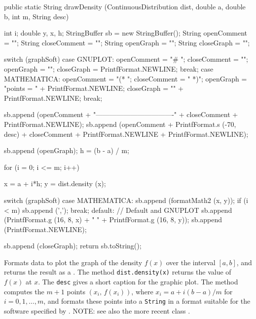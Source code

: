 \begin{code}

   public static String drawDensity (ContinuousDistribution dist, double a,
                                     double b, int m, String desc)\begin{hide} {
      int i;
      double y, x, h;
      StringBuffer sb = new StringBuffer();
      String openComment = "";
      String closeComment = "";
      String openGraph = "";
      String closeGraph = "";

      switch (graphSoft) {
      case GNUPLOT:
        openComment = "# ";
        closeComment = "";
        openGraph = "";
        closeGraph = PrintfFormat.NEWLINE;
        break;
      case MATHEMATICA:
        openComment = "(* ";
        closeComment = " *)";
        openGraph = "points = { " + PrintfFormat.NEWLINE;
        closeGraph = "}" + PrintfFormat.NEWLINE;
        break;
      }

      sb.append (openComment + "----------------------------------" +
                   closeComment  + PrintfFormat.NEWLINE);
      sb.append (openComment + PrintfFormat.s (-70, desc)
                    + closeComment  + PrintfFormat.NEWLINE +
                      PrintfFormat.NEWLINE);

      sb.append (openGraph);
      h = (b - a) / m;

      for (i = 0; i <= m; i++) {
         x = a + i*h;
         y = dist.density (x);

         switch (graphSoft) {
         case MATHEMATICA:
            sb.append (formatMath2 (x, y));
            if (i < m)
               sb.append (',');
            break;
         default: // Default and GNUPLOT
            sb.append (PrintfFormat.g (16, 8, x) +  "      " +
                       PrintfFormat.g (16, 8, y));
         }
         sb.append (PrintfFormat.NEWLINE);
      }
      sb.append (closeGraph);
      return sb.toString();
   }\end{hide}
\end{code}
 \begin{tabb}
  Formats data to plot the graph of the density $f(x)$ over the interval $[a,b]$,
  and returns the result as a . The method
  \texttt{dist.density(x)} returns the value of $f(x)$ at $x$.
  The  \texttt{desc} gives a short caption for the graphic
  plot. The method computes the $m+1$ points $(x_i,\, f(x_i))$,
  where $x_i = a + i (b-a)/m$ for $i=0,1,\ldots,m$, and formats these points
  into a \texttt{String} in a format suitable for the
  software specified by .
  NOTE: see also the more recent class
  .
 \end{tabb}
